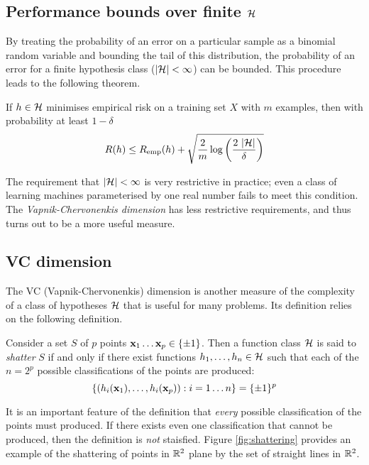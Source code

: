 \subsection{Performance bounds over finite $\mathcal{H}$}

By treating the probability of an error on a particular sample as a
binomial random variable and bounding the tail of this distribution,
the probability of an error for a finite hypothesis class ($|\mathcal{H}| <
\infty$) can be bounded.  This procedure leads to the following theorem.

\begin{theorem}
If $h \in \mathcal{H}$ minimises empirical risk on a training set $X$
with $m$ examples, then with probability at least $1 - \delta$
%
\begin{equation}
R(h) \leq R_{\mathrm{emp}}(h) + \sqrt{\frac{2}{m}
\log \left( \frac{2\  |\mathcal{H}|}{\delta} \right)}
\end{equation}
\end{theorem}

The requirement that $|\mathcal{H}| < \infty$ is very restrictive in
practice; even a class of learning machines parameterised by one real
number fails to meet this condition.  The \emph{Vapnik-Chervonenkis
dimension} has less restrictive requirements, and thus turns out to be
a more useful measure.

\subsection{VC dimension}
\label{acr:vcdim}
\label{sec:vcdim}

The VC (Vapnik-Chervonenkis) dimension is another measure of the
complexity of a class of hypotheses $\mathcal{H}$ that is useful for many
problems.  Its definition relies on the following definition.

\begin{definition}[Shattering]
Consider a set $S$ of $p$ points $\mathbf{x}_1 \ldots \mathbf{x}_p \in \{\pm 1\}$.
Then a function class $\mathcal{H}$ is said to \emph{shatter} $S$ if and
only if there exist functions $h_1, \ldots, h_n \in \mathcal{H}$ such that
each of the $n = 2^p$ possible classifications of the points are
produced: 
%
\begin{equation}
\left\{ (h_i(\mathbf{x}_1), \ldots, h_i(\mathbf{x}_p)): i=1 \ldots n \right\}
= \{\pm 1\}^p
\end{equation}
%
\end{definition}

It is an important feature of the definition that \emph{every}
possible classification of the points must produced.  If there exists
even one classification that cannot be produced, then the definition
is \emph{not} staisfied.  Figure \ref{fig:shattering} provides an
example of the shattering of points in $\mathbb{R}^2$ plane by the set of
straight lines in $\mathbb{R}^2$. 

